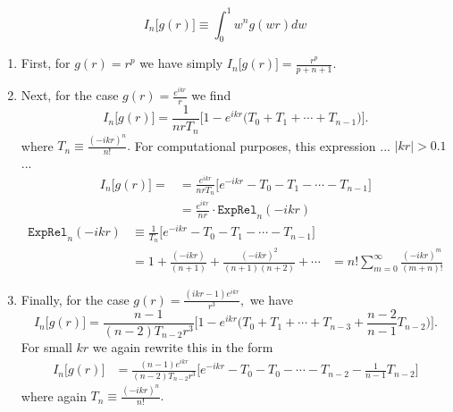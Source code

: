 \documentclass[letterpaper]{article}
\begin{document}
$$ I_n\Big[g(r)\Big] \equiv  \int_0^1 w^n g(wr) dw $$

\begin{enumerate}

\item First, for $g(r)=r^p$ we have simply $I_n\big[g(r)\big]=\frac{r^p}{p+n+1}.$

\item Next, for the case $ g(r)=\frac{e^{ikr}}{r}$ we find
$$
   I_n\Big[g(r)\Big]=
       \frac{1}{nrT_n }
       \bigg[ 1- e^{ikr}\Big(T_0 + T_1 + \cdots + T_{n-1}\Big) \bigg].
$$
where $T_n\equiv \frac{ (-ikr)^n } {n!}.$ 
For computational purposes, this expression  ... $|kr|>0.1$ ... 
\begin{align*}
 I_n\Big[g(r)\Big]=
    &=\frac{e^{ikr}}{nrT_n}
       \bigg[ e^{-ikr} - T_0 - T_1 - \cdots - T_{n-1} \bigg]
 \\
    &=\frac{e^{ikr}}{nr} \cdot \texttt{ExpRel}_n(-ikr)
\end{align*}
\begin{align*}
\texttt{ExpRel}_n(-ikr)
 &\equiv \frac{1}{T_n} \bigg[ e^{-ikr} - T_0 - T_1 - \cdots - T_{n-1} \bigg]
\\
 &= 1 + \frac{(-ikr)}{(n+1)} + \frac{(-ikr)^2}{(n+1)(n+2)} + \cdots
 &= n! \sum_{m=0}^\infty \frac{(-ikr)^m}{(m+n)!}
\end{align*}

\item Finally, for the case $g(r)=\frac{(ikr-1)e^{ikr}}{r^3},$ we have 
$$
   I_n\Big[g(r)\Big]=
       \frac{n-1}{(n-2)T_{n-2} r^3 }
       \bigg[ 1- e^{ikr}\Big(T_0 + T_1 + \cdots + T_{n-3} 
                                 + \frac{n-2}{n-1}T_{n-2} \Big)\bigg].
$$
For small $kr$ we again rewrite this in the form
\begin{align*}
 I_n\Big[g(r)\Big]
&=\frac{ (n-1)e^{ikr}}{(n-2)T_{n-2} r^3 }
  \bigg[ e^{-ikr} - T_0 - T_0 - \cdots - T_{n-2} 
                                 - \frac{1}{n-1}T_{n-2}\bigg]
\end{align*}
where again $T_n\equiv \frac{ (-ikr)^n } {n!}.$ 

\end{enumerate}
\end{document}
